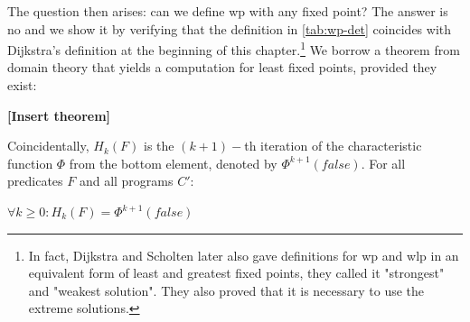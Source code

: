 The question then arises: can we define wp with any fixed point? 
The answer is no and we show it by verifying that the definition in \autoref{tab:wp-det} coincides with Dijkstra's definition at the beginning of this chapter.\footnote{In fact, Dijkstra and Scholten\cite{dijkstra90} later also gave definitions for wp and wlp in an equivalent form of least and greatest fixed points, they called it "strongest" and "weakest solution". They also proved that it is necessary to use the extreme solutions. }
We borrow a theorem from domain theory that yields a computation for least fixed points, provided they exist: 
\begin{theorem}
\textbf{[Insert theorem]}%
\end{theorem}


Coincidentally, $H_k(F)$ is the $(k+1)-$th iteration of the characteristic function $\Phi$ from the bottom element, denoted by $\Phi^{k+1}(false)$. 
For all predicates $F$ and all programs $C'$: 
\begin{lemma}
$\forall k\geq 0: H_k(F)=\Phi^{k+1}(false)$
\end{lemma}

